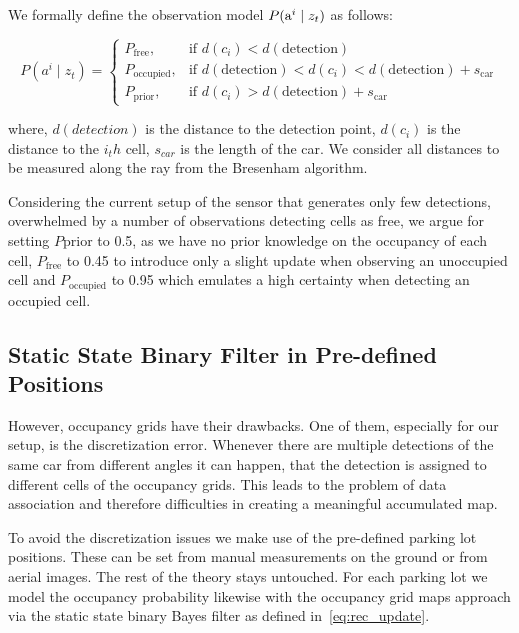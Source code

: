 We formally define the observation model $P({\mbox{a}^i} \mid z_t)$ as follows:

\begin{equation}
\label{eq:observation_model}
P(a^i \mid z_t) = \begin{cases} P_{\mathrm{free}}, & \mbox{if } d(c_i) < d(\mathrm{detection}) \\ P_{\mathrm{occupied}}, & \mbox{if } d(\mathrm{detection}) < d(c_i) < d(\mathrm{detection}) + s_{\mathrm{car}} \\ P_{\mathrm{prior}}, & \mbox{if } d(c_i) > d(\mathrm{detection}) + s_{\mathrm{car}} \end{cases}
\end{equation}

where, $d(detection)$ is the distance to the detection point, $d(c_i)$ is the
distance to the $i_th$ cell, $s_{car}$ is the length of the car. We consider
all distances to be measured along the ray from the Bresenham algorithm.

Considering the current setup of the sensor that generates only few
detections, overwhelmed by a number of observations detecting cells as free,
we argue for setting $P{\mathrm{prior}}$ to 0.5, as we have no prior knowledge on the
occupancy of each cell, $P_{\mathrm{free}}$ to 0.45 to introduce only a slight update
when observing an unoccupied cell and $P_{\mathrm{occupied}}$ to 0.95 which emulates a
high certainty when detecting an occupied cell.


\subsection{Static State Binary Filter in Pre-defined Positions}
\label{sub:static_state_binary_filter_in_pre_defined_positions}

However, occupancy grids have their drawbacks. One of them, especially for our
setup, is the discretization error. Whenever there are multiple detections of
the same car from different angles it can happen, that the detection is
assigned to different cells of the occupancy grids. This leads to the problem
of data association and therefore difficulties in creating a meaningful
accumulated map.

To avoid the discretization issues we make use of the pre-defined parking lot
positions. These can be set from manual measurements on the ground or from
aerial images. The rest of the theory stays untouched. For each parking lot we
model the occupancy probability likewise with the occupancy grid maps approach
via the static state binary Bayes filter as defined in~\eqref{eq:rec_update}.

